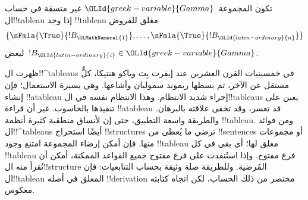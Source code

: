 \documentclass[../../../include/open-logic-section]{subfiles}
\begin{document}
تكون المجموعة~${\OLId{greek-variable}{Gamma}}$ غير متسقة في حساب ال!!{tableau} إذا وجد
!!{tableau} مغلق للفروض
\[
\{\sFmla{\True}{!B_{\OLMathNumeral{1}}}, \dots, \sFmla{\True}{!B_{\OLId{latin-ordinary}{n}}}\} 
\]
لبعض~$!B_{\OLId{latin-ordinary}{i}} \in {\OLId{greek-variable}{Gamma}}$.

ظهرت ال!!^{tableau}s في خمسينيات القرن العشرين عند إيفرت بِث وياكو هنتيكا، كلٌّ مستقل عن الآخر، ثم بسطها ريموند سموليان وأشاعها.
وهي يسيرة الاستعمال؛ فإن إنشاء !!a{tableau} إجراء شديد الانتظام. وهذا الانتظام نفسه في ال!!{tableau}s يعين على تنفيذها بالحاسوب.
غير أن قراءة !!a{tableau} قد تعسر، وقد تخفى علاقته بالبرهان. والطريقة واسعة التطبيق، حتى إن لأنساق منطقية كثيرة أنظمة
!!{tableau}. ومن فوائد ال!!^{tableau}s أيضًا استخراج
!!{structure}s ترضي ما يُعطى من !!{sentence}s أو مجموعات منها.
فإن أمكن إرضاء المجموعة امتنع وجود !!{tableau} مغلق لها؛ أي بقي في كل
!!{tableau} فرع مفتوح. وإذا استُنفدت على فرع مفتوح جميع القواعد الممكنة، أمكن أن تُقرأ منه ال!!{structure} المُرضية.
وللطريقة صلة وثيقة بحساب التتابعيات: فإن ال!!{tableau} المغلق في أصله
!!{derivation} مختصر من ذلك الحساب، لكن اتجاه كتابته معكوس.
\end{document}
